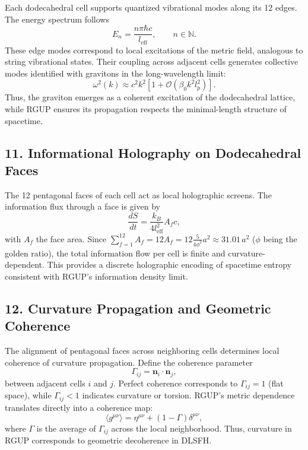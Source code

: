 \documentclass[11pt,oneside]{book}
\numberwithin{equation}{chapter}
\newcommand{\betaz}{\beta_0}
\begin{document}
Each dodecahedral cell supports quantized vibrational modes along its 12 edges.  
The energy spectrum follows
\begin{equation}
E_n = \frac{n\pi\hbar c}{l_{\text{eff}}}, \qquad n\in\mathbb{N}.
\end{equation}
These edge modes correspond to local excitations of the metric field, analogous to string vibrational states.  
Their coupling across adjacent cells generates collective modes identified with gravitons in the long-wavelength limit:
\begin{equation}
\omega^2(k) \approx c^2k^2\left[1 + \mathcal{O}(\betaz k^2 l_p^2)\right].
\end{equation}
Thus, the graviton emerges as a coherent excitation of the dodecahedral lattice, while RGUP ensures its propagation respects the minimal-length structure of spacetime.

\subsection*{11. Informational Holography on Dodecahedral Faces}

The 12 pentagonal faces of each cell act as local holographic screens.  
The information flux through a face is given by
\begin{equation}
\frac{dS}{dt} = \frac{k_B}{4l_{\text{eff}}^2}A_f c,
\end{equation}
with $A_f$ the face area.  
Since $\sum_{f=1}^{12} A_f = 12 A_f = 12\frac{5}{4\phi^2} a^2 \approx 31.01\,a^2$ ($\phi$ being the golden ratio), the total information flow per cell is finite and curvature-dependent.  
This provides a discrete holographic encoding of spacetime entropy consistent with RGUP’s information density limit.

\subsection*{12. Curvature Propagation and Geometric Coherence}

The alignment of pentagonal faces across neighboring cells determines local coherence of curvature propagation.  
Define the coherence parameter
\begin{equation}
\Gamma_{ij} = \mathbf{n}_i\!\cdot\!\mathbf{n}_j,
\end{equation}
between adjacent cells $i$ and $j$.  
Perfect coherence corresponds to $\Gamma_{ij}=1$ (flat space), while $\Gamma_{ij}<1$ indicates curvature or torsion.  
RGUP’s metric dependence translates directly into a coherence map:
\begin{equation}
\langle g^{\mu\nu}\rangle 
= \eta^{\mu\nu} + (1-\Gamma)\delta^{\mu\nu},
\end{equation}
where $\Gamma$ is the average of $\Gamma_{ij}$ across the local neighborhood.  
Thus, curvature in RGUP corresponds to geometric decoherence in DLSFH.
\end{document}

